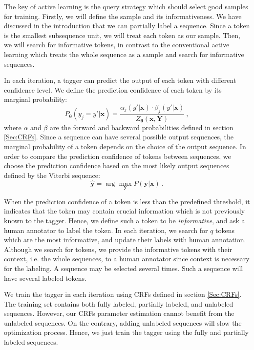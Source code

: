 \documentclass[english]{jnlp_JS2.0}
\begin{document}
The key of active learning is the query strategy which should select good samples for training. Firstly, we will define the sample and its informativeness. We have discussed in the introduction that we can partially label a sequence. Since a token is the smallest subsequence unit, we will treat each token as our sample. Then, we will search for informative tokens, in contrast to the conventional active learning which treats the whole sequence as a sample and search for informative sequences.

In each iteration, a tagger can predict the output of each token with different confidence level. We define the prediction confidence of each token by its marginal probability:
\begin{equation}
	P_{\mathbf{\theta}}(y_j=y'|\mathbf{x}) = \frac{\alpha_j(y'|\mathbf{x}) \cdot \beta_j(y'|\mathbf{x})}{Z_{\mathbf{\theta}}(\mathbf{x,Y})}\ ,
	\label{Eq:TokenScore}
\end{equation}
where $\alpha$ and $\beta$ are the forward and backward probabilities defined in section \ref{Sec:CRFs}. Since a sequence can have several possible output sequences, the marginal probability of a token depends on the choice of the output sequence. In order to compare the prediction confidence of tokens between sequences, we choose the prediction confidence based on the most likely output sequences defined by the Viterbi sequence:
\begin{equation}
	\mathbf{\hat{y}} = \arg\max_{\mathbf{y}} P(\mathbf{y|x})\ .
	\label{Eq:SentenceScore}
\end{equation}

When the prediction confidence of a token is less than the predefined threshold, it indicates that the token may contain crucial information which is not previously known to the tagger. Hence, we define such a token to be \textit{informative}, and ask a human annotator to label the token. In each iteration, we search for $q$ tokens which are the most informative, and update their labels with human annotation. Although we search for tokens, we provide the informative tokens with their context, i.e. the whole sequences, to a human annotator since context is necessary for the labeling. A sequence may be selected several times. Such a sequence will have several labeled tokens.

We train the tagger in each iteration using CRFs defined in section \ref{Sec:CRFs}. The training set contains both fully labeled, partially labeled, and unlabeled sequences. However, our CRFs parameter estimation cannot benefit from the unlabeled sequences. On the contrary, adding unlabeled sequences will slow the optimization process. Hence, we just train the tagger using the fully and partially labeled sequences.
\end{document}
